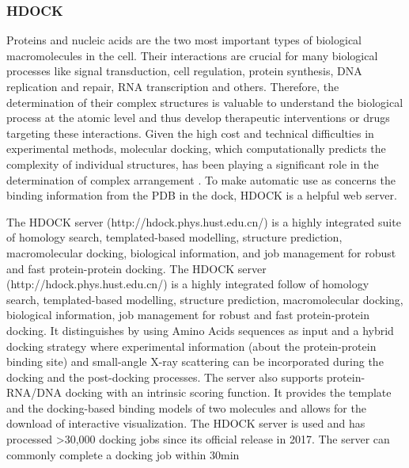 \documentclass[11pt, letterpaper, english]{article}
\begin{document}
\subsubsection{HDOCK}
		\par {Proteins and nucleic acids are the two most important types of biological macromolecules in the cell. Their interactions are crucial for many biological processes like signal transduction, cell regulation, protein synthesis, DNA replication and repair, RNA transcription and others. Therefore, the determination of their complex structures is valuable to understand the biological process at the atomic level and thus develop therapeutic interventions or drugs targeting these interactions. Given the high cost and technical difficulties in experimental methods, molecular docking, which computationally predicts the complexity of individual structures, has been playing a significant role in the determination of complex arrangement \cite{Yan_2017}. To make automatic use as concerns the binding information from the PDB in the dock, HDOCK is a helpful web server.}
		
   \par {The HDOCK server (http://hdock.phys.hust.edu.cn/) is a highly integrated suite of homology search, templated-based modelling, structure prediction, macromolecular docking, biological information, and job management for robust and fast protein-protein docking. The HDOCK server (http://hdock.phys.hust.edu.cn/) is a highly integrated follow of homology search, templated-based modelling, structure prediction, macromolecular docking, biological information, job management for robust and fast protein-protein docking. It distinguishes by using Amino Acids sequences as input and a hybrid docking strategy where experimental information (about the protein-protein binding site) and small-angle X-ray scattering can be incorporated during the docking and the post-docking processes. The server also supports protein-RNA/DNA docking with an intrinsic scoring function. It provides the template and the docking-based binding models of two molecules and allows for the download of interactive visualization. The HDOCK server is used and has processed >30,000 docking jobs since its official release in 2017.  The server can commonly complete a docking job within 30min \cite{Yan_2020}}
\end{document}
